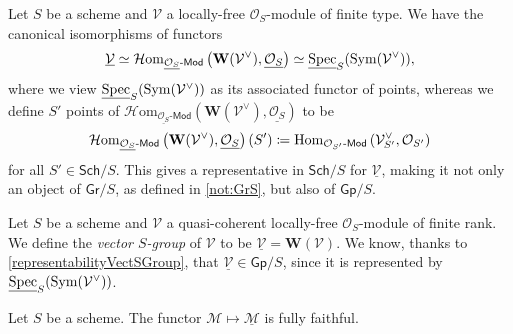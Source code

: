 \begin{prop}\label{representabilityVectSGroup}
	Let \(S\) be a scheme and \(\mathcal{V}\) a locally-free 
	\(\mathcal{O}_{ S }\)-module of finite type.
	We have the canonical isomorphisms of functors
	\begin{equation*}
		\underline{\mathcal{V}} \simeq
		\mathcal{H}\mathrm{om}_{ \underline{\mathcal{O}_{ S }}\text{-}\mathsf{Mod} }
		\left(\mathbf{W}(\mathcal{V}^\vee) , \underline{\mathcal{O}_{ S }} \right) \simeq
		\underline{\operatorname{Spec}}_S(\operatorname{Sym}(\mathcal{V}^\vee))
	,\end{equation*}
	where we view \(\underline{\operatorname{Spec}}_S(\operatorname{Sym}(\mathcal{V}^\vee))\)
	as its associated functor of points, whereas
	we define \(S'\) points of
	\(\mathcal{H}\mathrm{om}_{ \underline{\mathcal{O}_{ S }}\text{-}\mathsf{Mod} }
		\left(\mathbf{W}(\mathcal{V}^\vee) , \underline{\mathcal{O}_{ S }} \right)\) 
		to be 
	\begin{equation*}
		\mathcal{H}\mathrm{om}_{ \underline{\mathcal{O}_{ S }}\text{-}\mathsf{Mod} }
		\left(\mathbf{W}(\mathcal{V}^\vee) , \underline{\mathcal{O}_{ S }} \right) (S') \coloneqq
		\operatorname{Hom}_{ \mathcal{O}_{ S' }\text{-}\mathsf{Mod} }
		\left(\mathcal{V}^\vee_{ S' }, \mathcal{O}_{ S' }\right)
	\end{equation*}
	for all \(S' \in \mathsf{Sch}/ S \).
	This gives a representative in $\mathsf{Sch}/S$ for 
	$\underline{\mathcal{V}}$, making it not only an object of $\mathsf{Gr}/S$,
	as defined in \cref{not:GrS}, but also of $\mathsf{Gp}/S$.
\end{prop}


\begin{defn}\label{defn:VectorSGroup}
	Let \(S\) be a scheme and \(\mathcal{V}\) a quasi-coherent
	locally-free \(\mathcal{O}_{ S }\)-module of finite rank.
	We define the \emph{vector \(S\)-group} of \(\mathcal{V}\)
	to be \(\underline{\mathcal{V}} = \mathbf{W}(\mathcal{V})\).
	We know, thanks to \cref{representabilityVectSGroup},
	that \(\underline{\mathcal{V}} \in \mathsf{Gp}/S\), since
	it is represented by \(\underline{\operatorname{Spec}}_S(\operatorname{Sym}(\mathcal{V}^\vee))\).
\end{defn}


\begin{prop}
	Let $S$ be a scheme. 
	The functor $\mathcal{M} \mapsto \underline{\mathcal{M}}$
	is fully faithful.
\end{prop}


